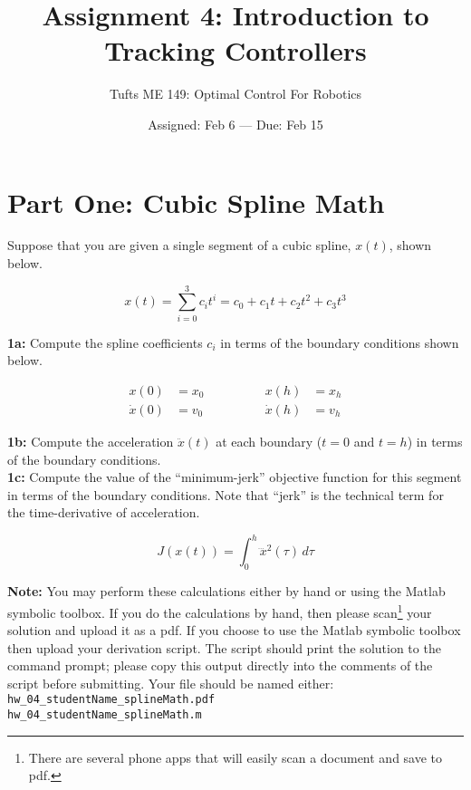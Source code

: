 

\title{Assignment 4:  Introduction to Tracking Controllers}
\date{Assigned:  Feb 6  ---  Due:  Feb 15}
\author{Tufts ME 149:  Optimal Control For Robotics}

\maketitle

\section*{Part One: Cubic Spline Math}

Suppose that you are given a single segment of a cubic spline, $x(t)$, shown below.

\begin{equation}
x(t) = \sum_{i=0}^3 c_i t^i = c_0 + c_1 t + c_2 t^2 + c_3 t ^ 3
\end{equation}

\textbf{1a:} Compute the spline coefficients $c_i$ in terms of the boundary conditions shown below. \\

\vspace{-1em}

\begin{align}
x(0) &= x_0
  \quad \quad & \quad \quad
x(h) &= x_h
  \\
\dot{x}(0) &= v_0
  \quad \quad & \quad \quad
\dot{x}(h) &= v_h
\end{align}

\textbf{1b:} Compute the acceleration $\ddot{x}(t)$ at each boundary ($t=0$ and $t=h$)
in terms of the boundary conditions.\\

\textbf{1c:} Compute the value of the
``minimum-jerk'' objective function for this segment in terms of the boundary conditions.
Note that ``jerk'' is the technical term for the time-derivative of acceleration.

\begin{equation}
  J(x(t)) = \int_0^h \! \dddot{x}^2(\tau) \, d\tau
\end{equation}

\textbf{Note:}
You may perform these calculations either by hand or using the Matlab symbolic toolbox.
If you do the calculations by hand, then please
scan\footnote{There are several phone apps that will easily scan a document and save to pdf.}
your solution and upload it as a pdf.
If you choose to use the Matlab symbolic toolbox then upload your derivation script.
The script should print the solution to the command prompt;
please copy this output directly into the comments of the script before submitting.
Your file should be named either: \\
\texttt{hw\_04\_studentName\_splineMath.pdf} \\
\texttt{hw\_04\_studentName\_splineMath.m}

